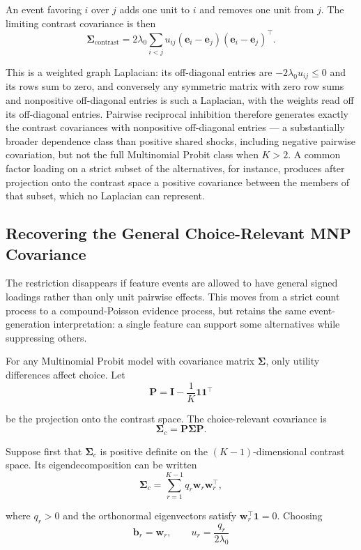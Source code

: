 \documentclass[
  man,
  floatsintext,
  longtable,
  a4paper,
  nolmodern,
  notxfonts,
  notimes,
  colorlinks=true,linkcolor=blue,citecolor=blue,urlcolor=blue]{apa7}
\begin{document}
An event favoring \(i\) over \(j\) adds one unit to \(i\) and removes
one unit from \(j\). The limiting contrast covariance is then \[
\boldsymbol\Sigma_{\mathrm{contrast}}
=
2\lambda_0
\sum_{i<j}
u_{ij}
(\mathbf e_i-\mathbf e_j)
(\mathbf e_i-\mathbf e_j)^\top.
\]

This is a weighted graph Laplacian: its off-diagonal entries are
\(-2\lambda_0 u_{ij}\leq 0\) and its rows sum to zero, and conversely
any symmetric matrix with zero row sums and nonpositive off-diagonal
entries is such a Laplacian, with the weights read off its off-diagonal
entries. Pairwise reciprocal inhibition therefore generates exactly the
contrast covariances with nonpositive off-diagonal entries --- a
substantially broader dependence class than positive shared shocks,
including negative pairwise covariation, but not the full Multinomial
Probit class when \(K>2\). A common factor loading on a strict subset of
the alternatives, for instance, produces after projection onto the
contrast space a positive covariance between the members of that subset,
which no Laplacian can represent.

\subsection{Recovering the General Choice-Relevant MNP
Covariance}\label{recovering-the-general-choice-relevant-mnp-covariance}

The restriction disappears if feature events are allowed to have general
signed loadings rather than only unit pairwise effects. This moves from
a strict count process to a compound-Poisson evidence process, but
retains the same event-generation interpretation: a single feature can
support some alternatives while suppressing others.

For any Multinomial Probit model with covariance matrix
\(\boldsymbol\Sigma\), only utility differences affect choice. Let \[
\mathbf P
=
\mathbf I-\frac{1}{K}\mathbf 1\mathbf 1^\top
\]

be the projection onto the contrast space. The choice-relevant
covariance is \[
\boldsymbol\Sigma_c
=
\mathbf P\boldsymbol\Sigma\mathbf P.
\]

Suppose first that \(\boldsymbol\Sigma_c\) is positive definite on the
\((K-1)\)-dimensional contrast space. Its eigendecomposition can be
written \[
\boldsymbol\Sigma_c
=
\sum_{r=1}^{K-1}
q_r\mathbf w_r\mathbf w_r^\top,
\]

where \(q_r>0\) and the orthonormal eigenvectors satisfy
\(\mathbf w_r^\top\mathbf 1=0\). Choosing \[
\mathbf b_r=\mathbf w_r,
\qquad
u_r=\frac{q_r}{2\lambda_0}
\]
\end{document}
